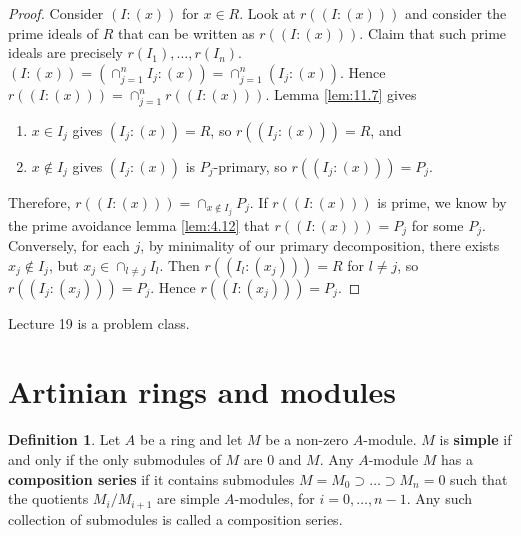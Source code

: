 \documentclass{article}
\newcommand{\rb}[1]{\left( #1 \right)}
\theoremstyle{definition}\newtheorem{definition}{Definition}[section]
\theoremstyle{definition}\newtheorem{remark}[definition]{Remark}
\theoremstyle{definition}\newtheorem*{example}{Example}
\theoremstyle{definition}\newtheorem*{note}{Note}
\begin{document}
\begin{proof}
Consider $ \rb{I : \rb{x}} $ for $ x \in R $. Look at $ r\rb{\rb{I : \rb{x}}} $ and consider the prime ideals of $ R $ that can be written as $ r\rb{\rb{I : \rb{x}}} $. Claim that such prime ideals are precisely $ r\rb{I_1}, \dots, r\rb{I_n} $. $ \rb{I : \rb{x}} = \rb{\cap_{j = 1}^n I_j : \rb{x}} = \cap_{j = 1}^n \rb{I_j : \rb{x}} $. Hence $ r\rb{\rb{I : \rb{x}}} = \cap_{j = 1}^n r\rb{\rb{I : \rb{x}}} $. Lemma \ref{lem:11.7} gives
\begin{enumerate}
\item $ x \in I_j $ gives $ \rb{I_j : \rb{x}} = R $, so $ r\rb{\rb{I_j : \rb{x}}} = R $, and
\item $ x \notin I_j $ gives $ \rb{I_j : \rb{x}} $ is $ P_j $-primary, so $ r\rb{\rb{I_j : \rb{x}}} = P_j $.
\end{enumerate}
Therefore, $ r\rb{\rb{I : \rb{x}}} = \cap_{x \notin I_j} P_j $. If $ r\rb{\rb{I : \rb{x}}} $ is prime, we know by the prime avoidance lemma \ref{lem:4.12} that $ r\rb{\rb{I : \rb{x}}} = P_j $ for some $ P_j $. Conversely, for each $ j $, by minimality of our primary decomposition, there exists $ x_j \notin I_j $, but $ x_j \in \cap_{l \ne j} I_l $. Then $ r\rb{\rb{I_l : \rb{x_j}}} = R $ for $ l \ne j $, so $ r\rb{\rb{I_j : \rb{x_j}}} = P_j $. Hence $ r\rb{\rb{I : \rb{x_j}}} = P_j $.
\end{proof}


Lecture 19 is a problem class.


\section{Artinian rings and modules}

\begin{definition}
Let $ A $ be a ring and let $ M $ be a non-zero $ A $-module. $ M $ is \textbf{simple} if and only if the only submodules of $ M $ are $ 0 $ and $ M $. Any $ A $-module $ M $ has a \textbf{composition series} if it contains submodules $ M = M_0 \supset \dots \supset M_n = 0 $ such that the quotients $ M_i / M_{i + 1} $ are simple $ A $-modules, for $ i = 0, \dots, n - 1 $. Any such collection of submodules is called a composition series.
\end{definition}
\end{document}
